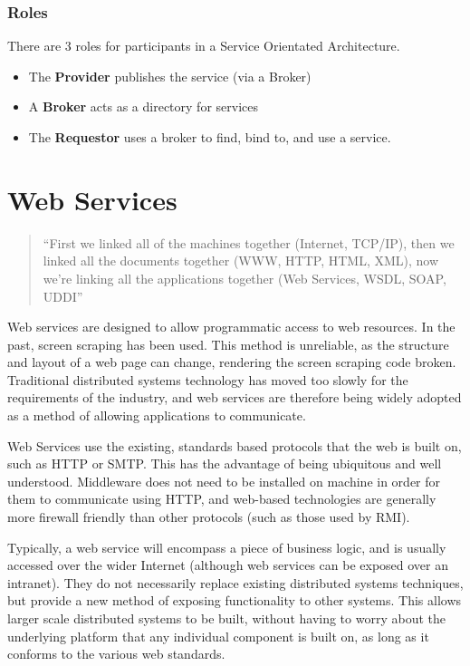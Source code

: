\documentclass{article}
\begin{document}
\subsubsection{Roles}
There are 3 roles for participants in a Service Orientated Architecture.

\begin{itemize}
    \item The \textbf{Provider} publishes the service (via a Broker)
    \item A \textbf{Broker} acts as a directory for services
    \item The \textbf{Requestor} uses a broker to find, bind to, and use a service.
\end{itemize}

\section{Web Services}

\begin{quote}
    ``First we linked all of the machines together (Internet, TCP/IP), then we linked all the documents together (WWW, HTTP, HTML, XML), now we're linking all the applications together (Web Services, WSDL, SOAP, UDDI''
\end{quote}

Web services are designed to allow programmatic access to web resources. In the past, screen scraping has been used. This method is unreliable, as the structure and layout of a web page can change, rendering the screen scraping code broken. Traditional distributed systems technology has moved too slowly for the requirements of the industry, and web services are therefore being widely adopted as a method of allowing applications to communicate.

Web Services use the existing, standards based protocols that the web is built on, such as HTTP or SMTP. This has the advantage of being ubiquitous and well understood. Middleware does not need to be installed on machine in order for them to communicate using HTTP, and web-based technologies are generally more firewall friendly than other protocols (such as those used by RMI).

Typically, a web service will encompass a piece of business logic, and is usually accessed over the wider Internet (although web services can be exposed over an intranet). They do not necessarily replace existing distributed systems techniques, but provide a new method of exposing functionality to other systems. This allows larger scale distributed systems to be built, without having to worry about the underlying platform that any individual component is built on, as long as it conforms to the various web standards.
\end{document}
